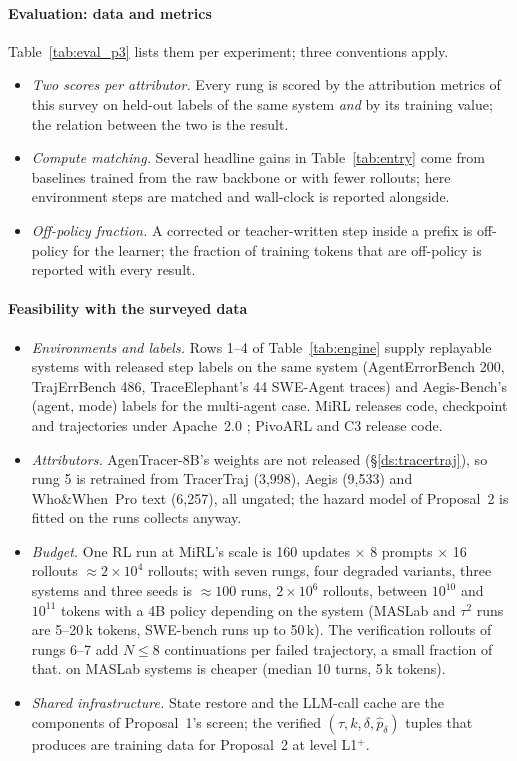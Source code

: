 \documentclass[10pt,a4paper]{article}
\begin{document}
\paragraph{Evaluation: data and metrics} Table~\ref{tab:eval_p3} lists them per experiment; three conventions apply.
\begin{itemize}[leftmargin=1.1em]
\item \emph{Two scores per attributor.} Every rung is scored by the attribution metrics of this survey on held-out labels of the same system \emph{and} by its training value; the relation between the two is the result.
\item \emph{Compute matching.} Several headline gains in Table~\ref{tab:entry} come from baselines trained from the raw backbone or with fewer rollouts; here environment steps are matched and wall-clock is reported alongside.
\item \emph{Off-policy fraction.} A corrected or teacher-written step inside a prefix is off-policy for the learner; the fraction of training tokens that are off-policy is reported with every result.
\end{itemize}

\paragraph{Feasibility with the surveyed data}
\begin{itemize}[leftmargin=1.1em]
\item \emph{Environments and labels.} Rows 1--4 of Table~\ref{tab:engine} supply replayable systems with released step labels on the same system (AgentErrorBench 200, TrajErrBench 486, TraceElephant's 44 SWE-Agent traces) and Aegis-Bench's (agent, mode) labels for the multi-agent case. MiRL releases code, checkpoint and trajectories under Apache~2.0 \cite{tian2026mirl}; PivoARL and C3 release code.
\item \emph{Attributors.} AgenTracer-8B's weights are not released (\S\ref{ds:tracertraj}), so rung 5 is retrained from TracerTraj (3,998), Aegis (9,533) and Who\&When~Pro text (6,257), all ungated; the hazard model of Proposal~2 is fitted on the runs  collects anyway.
\item \emph{Budget.} One RL run at MiRL's scale is 160 updates $\times$ 8 prompts $\times$ 16 rollouts $\approx 2\times10^4$ rollouts;  with seven rungs, four degraded variants, three systems and three seeds is $\approx100$ runs, $2\times10^6$ rollouts, between $10^{10}$ and $10^{11}$ tokens with a 4B policy depending on the system (MASLab and $\tau^2$ runs are 5--20\,k tokens, SWE-bench runs up to 50\,k). The verification rollouts of rungs 6--7 add $N\le8$ continuations per failed trajectory, a small fraction of that.  on MASLab systems is cheaper (median 10 turns, 5\,k tokens).
\item \emph{Shared infrastructure.} State restore and the LLM-call cache are the components of Proposal~1's screen; the verified $(\tau,k,\delta,\hat p_\delta)$ tuples that  produces are training data for Proposal~2 at level L1$^{+}$.
\end{itemize}
\end{document}
